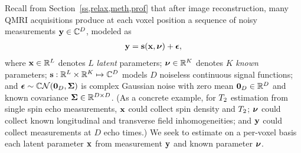 Recall from Section~\ref{ss,relax,meth,prof}
that after image reconstruction,
many QMRI acquisitions 
produce at each voxel position
a sequence of noisy measurements
$\mathbf{y} \in \mathbb{C}^{D}$, 
modeled as
\begin{align}
	\bmy = \bmsa{\bmx, \bmnu} + \bmeps,
	\label{eq:perk,model}
\end{align}
where $\mathbf{x} \in \mathbb{R}^{L}$ denotes $L$ \emph{latent} parameters;
$\boldsymbol{\nu} \in \mathbb{R}^{K}$ denotes $K$ \emph{known} parameters;  
$\mathbf{s} : \mathbb{R}^{L} \times \mathbb{R}^{K} \mapsto \mathbb{C}^{D}$ 
models $D$ noiseless continuous signal functions;
and $\bmeps \sim \cgauss{\zeros{D}}{\bmSig}$ is complex Gaussian noise
with zero mean $\boldsymbol{0}_{D} \in \mathbb{R}^{D}$
and known covariance $\boldsymbol{\Sigma} \in \mathbb{R}^{D \times D}$.
(As a concrete example,
for $T_2$ estimation
from single spin echo measurements,
$\mathbf{x}$ could collect spin density and $T_2$;
$\boldsymbol{\nu}$ could collect known longitudinal and transverse field inhomogeneities;
and 
$\mathbf{y}$ could collect measurements at $D$ echo times.)
We seek to estimate 
on a per-voxel basis
each latent parameter $\mathbf{x}$
from measurement $\mathbf{y}$ 
and known parameter $\boldsymbol{\nu}$.

